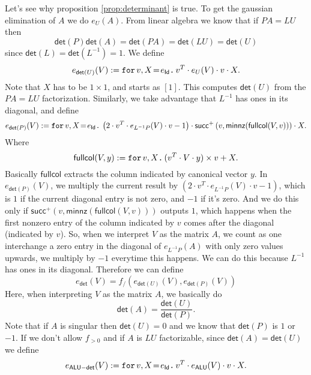 Let's see why proposition \ref{prop:determinant} is true. To get the gaussian elimination of $A$ we do $e_{U}(A)$. From linear algebra we know that if $PA=LU$
then
$$
\mathsf{det}(P)\mathsf{det}(A)=\mathsf{det}(PA)=\mathsf{det}(LU)=\mathsf{det}(U)
$$
since $\mathsf{det}(L)=\mathsf{det}(L^{-1})=1$. We define
$$
e_{\mathsf{det}(U)}(V):=\initf{e_{\mathsf{Id}}}{v}{X}v^T\cdot e_{U}(V) \cdot v \cdot X.
$$
Note that $X$ has to be $1\times 1$, and starts as $[1]$. This computes $\mathsf{det}(U)$ from the $PA=LU$ factorization.
Similarly, we take advantage that $L^{-1}$ has ones in its diagonal, and define
$$
e_{\mathsf{det}(P)}(V):=\initf{e_{\mathsf{Id}}}{v}{X}\left( 2\cdot v^T \cdot e_{L^{-1}P}(V) \cdot v - 1 \right)\cdot \mathsf{succ}^+\left( v, \mathsf{minnz}(\mathsf{fullcol}(V,v)) \right) \cdot X.
$$
Where
$$
\mathsf{fullcol}(V,y):= \ffor{v}{X}{(v^T\cdot V \cdot y)\times v + X}.
$$
Basically $\mathsf{fullcol}$ extracts the column indicated by canonical vector $y$. In $e_{\mathsf{det}(P)}(V)$, we multiply the current result by $\left( 2\cdot v^T \cdot e_{L^{-1}P}(V) \cdot v - 1 \right)$, which is $1$ if the current diagonal entry is not zero, and $-1$ if it's zero.
And we do this only if $\mathsf{succ}^+\left( v, \mathsf{minnz}(\mathsf{fullcol}(V,v)) \right)$ outputs $1$, which happens when the first nonzero entry of the column indicated by $v$ comes after the diagonal (indicated by $v$).
So, when we interpret $V$ as the matrix $A$, we count as one interchange a zero entry in the diagonal of $e_{L^{-1}P}(A)$ with only zero values upwards, we multiply by $-1$ everytime this happens. We can do this because $L^{-1}$ has ones in its diagonal.
Therefore we can define
$$
e_{\mathsf{det}}(V)=f_/\left( e_{\mathsf{det}(U)}(V), e_{\mathsf{det}(P)}(V) \right)
$$
Here, when interpreting $V$ as the matrix $A$, we basically do
$$
\mathsf{det}(A)=\dfrac{\mathsf{det}(U)}{\mathsf{det}(P)}.
$$
Note that if $A$ is singular then $\mathsf{det}(U)=0$ and we know that $\mathsf{det}(P)$ is $1$ or $-1$. If we don't allow $f_{>0}$ and if $A$ is $LU$ factorizable, since $\mathsf{det}(A)=\mathsf{det}(U)$ we define
$$
e_{\mathsf{ALU-det}}(V):=\initf{e_{\mathsf{Id}}}{v}{X}v^T\cdot e_{\mathsf{ALU}}(V) \cdot v \cdot X.
$$

